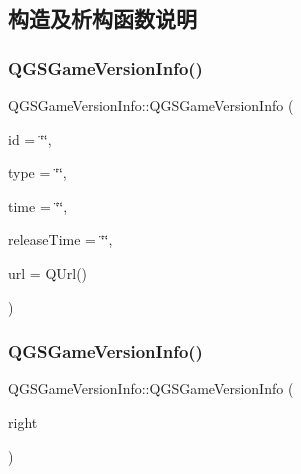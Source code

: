 \subsection{构造及析构函数说明}
\mbox{\label{class_q_g_s_game_version_info_a15d1b9ac6be0a5b4ca7b78b7737e3866}} 
\subsubsection{\texorpdfstring{Q\+G\+S\+Game\+Version\+Info()}{QGSGameVersionInfo()}\hspace{0.1cm}{\footnotesize\ttfamily [1/3]}}
{\footnotesize\ttfamily Q\+G\+S\+Game\+Version\+Info\+::\+Q\+G\+S\+Game\+Version\+Info (\begin{DoxyParamCaption}\item[{const Q\+String \&}]{id = {\ttfamily \char`\"{}\char`\"{}},  }\item[{const Q\+String \&}]{type = {\ttfamily \char`\"{}\char`\"{}},  }\item[{const Q\+String \&}]{time = {\ttfamily \char`\"{}\char`\"{}},  }\item[{const Q\+String \&}]{release\+Time = {\ttfamily \char`\"{}\char`\"{}},  }\item[{const Q\+Url \&}]{url = {\ttfamily QUrl()} }\end{DoxyParamCaption})}

\mbox{\label{class_q_g_s_game_version_info_a784da4680f9f531ecdd0a0479c33b3be}} 
\subsubsection{\texorpdfstring{Q\+G\+S\+Game\+Version\+Info()}{QGSGameVersionInfo()}\hspace{0.1cm}{\footnotesize\ttfamily [2/3]}}
{\footnotesize\ttfamily Q\+G\+S\+Game\+Version\+Info\+::\+Q\+G\+S\+Game\+Version\+Info (\begin{DoxyParamCaption}\item[{const \mbox{\hyperlink{class_q_g_s_game_version_info}{Q\+G\+S\+Game\+Version\+Info}} \&}]{right }\end{DoxyParamCaption})\hspace{0.3cm}{\ttfamily [default]}}

